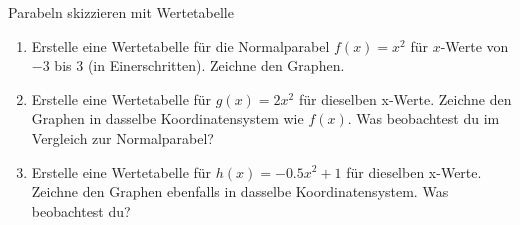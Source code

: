 \begin{aufgabenumgebung}{Parabeln skizzieren mit Wertetabelle}
\begin{enumerate}
    \item Erstelle eine Wertetabelle für die Normalparabel $f(x)=x^2$ für $x$-Werte von $-3$ bis $3$ (in Einerschritten). Zeichne den Graphen.
    \item Erstelle eine Wertetabelle für $g(x)=2x^2$ für dieselben x-Werte. Zeichne den Graphen in dasselbe Koordinatensystem wie $f(x)$. Was beobachtest du im Vergleich zur Normalparabel?
    \item Erstelle eine Wertetabelle für $h(x)=-0.5x^2+1$ für dieselben x-Werte. Zeichne den Graphen ebenfalls in dasselbe Koordinatensystem. Was beobachtest du?
\end{enumerate}
\end{aufgabenumgebung}



